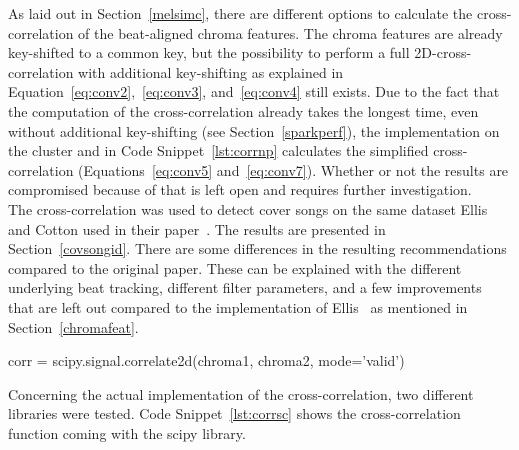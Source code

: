 As laid out in Section~\ref{melsimc}, there are different options to calculate the cross-correlation of the beat-aligned chroma features. The chroma features are already key-shifted to a common key, but the possibility to perform a full 2D-cross-correlation with additional key-shifting as explained in Equation~\eqref{eq:conv2},~\eqref{eq:conv3}, and~\eqref{eq:conv4} still exists. Due to the fact that the computation of the cross-correlation already takes the longest time, even without additional key-shifting (see Section~\ref{sparkperf}), the implementation on the cluster and in Code Snippet~\ref{lst:corrnp} calculates the simplified cross-correlation (Equations~\eqref{eq:conv5} and~\eqref{eq:conv7}). Whether or not the results are compromised because of that is left open and requires further investigation.\\
\noindent The cross-correlation was used to detect cover songs on the same dataset Ellis and Cotton used in their paper~\cite{cover802}. The results are presented in Section~\ref{covsongid}. There are some differences in the resulting recommendations compared to the original paper. These can be explained with the different underlying beat tracking, different filter parameters, and a few improvements that are left out compared to the implementation of Ellis~\cite{cover802} as mentioned in Section~\ref{chromafeat}.\\

\begin{pythonCode}[frame=single,label={lst:corrsc},caption={Cross-correlation scipy},captionpos=b]
corr = scipy.signal.correlate2d(chroma1, chroma2, mode='valid')
\end{pythonCode}

\noindent Concerning the actual implementation of the cross-correlation, two different libraries were tested. Code Snippet~\ref{lst:corrsc} shows the cross-correlation function coming with the scipy library.

